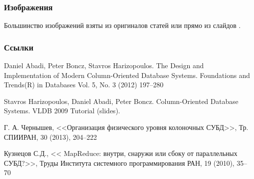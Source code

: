 \documentclass{beamer}
\begin{document}
\begin{frame}
\frametitle{Изображения}

Большинство изображений взяты из оригиналов статей или прямо из слайдов \cite{Harizopoulos2009}.

\end{frame}


\begin{frame}[allowframebreaks]
\frametitle{Ссылки}
\footnotesize{
\begin{thebibliography}{99}

 Daniel Abadi, Peter Boncz, Stavros Harizopoulos. The Design and Implementation of Modern Column-Oriented Database Systems. Foundations and Trends(R) in Databases Vol. 5, No. 3 (2012) 197--280

 Stavros Harizopoulos, Daniel Abadi, Peter Boncz. Column-Oriented Database Systems. VLDB 2009 Tutorial (slides).

	Г. А. Чернышев, <<Организация физического уровня колоночных СУБД>>, Тр. СПИИРАН, 30 (2013), 204--222

	 Кузнецов С.Д., << MapReduce: внутри, снаружи или сбоку от параллельных СУБД?>>, Труды Института системного программирования РАН, 19 (2010), 35--70








\end{thebibliography}}
\end{frame}
\end{document}
